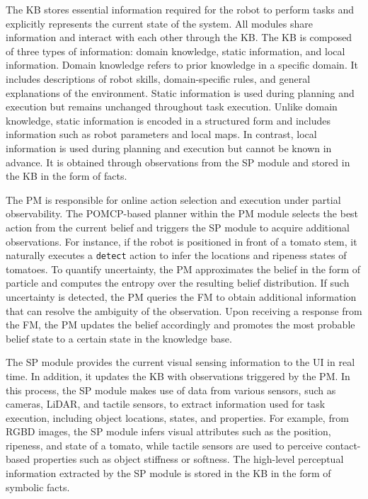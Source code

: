 The KB stores essential information required for the robot to perform tasks and explicitly represents the current state of the system. All modules share information and interact with each other through the KB. The KB is composed of three types of information: domain knowledge, static information, and local information. Domain knowledge refers to prior knowledge in a specific domain. It includes descriptions of robot skills, domain-specific rules, and general explanations of the environment. Static information is used during planning and execution but remains unchanged throughout task execution. Unlike domain knowledge, static information is encoded in a structured form and includes information such as robot parameters and local maps. In contrast, local information is used during planning and execution but cannot be known in advance. It is obtained through observations from the SP module and stored in the KB in the form of facts. 


The PM is responsible for online action selection and execution under partial observability. The POMCP-based planner within the PM module selects the best action from the current belief and triggers the SP module to acquire additional observations. For instance, if the robot is positioned in front of a tomato stem, it naturally executes a \texttt{detect} action to infer the locations and ripeness states of tomatoes. To quantify uncertainty, the PM approximates the belief in the form of particle and computes the entropy over the resulting belief distribution. If such uncertainty is detected, the PM queries the FM to obtain additional information that can resolve the ambiguity of the observation. Upon receiving a response from the FM, the PM updates the belief accordingly and promotes the most probable belief state to a certain state in the knowledge base.


The SP module provides the current visual sensing information to the UI in real time. In addition, it updates the KB with observations triggered by the PM. In this process, the SP module makes use of data from various sensors, such as cameras, LiDAR, and tactile sensors, to extract information used for task execution, including object locations, states, and properties. For example, from RGBD images, the SP module infers visual attributes such as the position, ripeness, and state of a tomato, while tactile sensors are used to perceive contact-based properties such as object stiffness or softness. The high-level perceptual information extracted by the SP module is stored in the KB in the form of symbolic facts.


